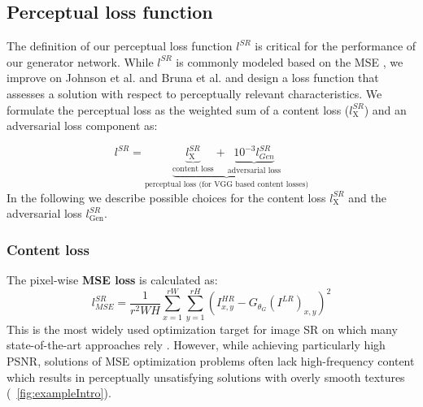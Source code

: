 \documentclass[10pt,twocolumn,letterpaper]{article}
\begin{document}
\subsection{Perceptual loss function}
\label{sec:losses}
The definition of our perceptual loss function $l^{SR}$  is critical for the performance of our generator network.
While $l^{SR}$ is commonly modeled based on the \ac{MSE}  \cite{dong2016image,Shi2016ESPCN}, we improve on Johnson et al. \cite{Johnson16PercepLoss} and Bruna et al. \cite{bruna2016super} and design a loss function that assesses a solution with respect to perceptually relevant characteristics.
We formulate the perceptual loss as the weighted sum of a content loss ($l^{SR}_\textrm{X}$) and an adversarial loss component as:

\begin{equation}
l^{SR} = \underbrace{\underbrace{l^{SR}_\textrm{X}}_{\text{content loss}} + \underbrace{10^{-3} l^{SR}_{Gen}}_{\text{adversarial loss}}}_{\text{perceptual loss (for VGG based content losses)}}
\end{equation}
In the following we describe possible choices for the content loss $l^{SR}_\textrm{X}$ and the adversarial loss $l^{SR}_\textrm{Gen}$.

\subsubsection{Content loss}

The pixel-wise \textbf{\ac{MSE} loss} is calculated as:
\begin{equation}
l^{SR}_{MSE} = \frac{1}{r^2WH} \sum_{x=1}^{rW} \sum_{y=1}^{rH} (I^{HR}_{x,y} - G_{\theta_G}(I^{LR})_{x,y})^2
\end{equation}
This is the most widely used optimization target for image \ac{SR} on which many state-of-the-art approaches rely \cite{dong2016image,Shi2016ESPCN}. However, while achieving particularly high \ac{PSNR}, solutions of \ac{MSE} optimization problems often lack high-frequency content which results in perceptually unsatisfying solutions with overly smooth textures (\cf \figurename~\ref{fig:exampleIntro}).
\end{document}
